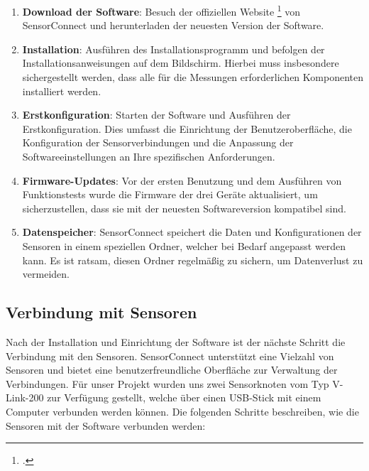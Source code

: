 \begin{enumerate}
    \item \textbf{Download der Software}: Besuch der offiziellen Website \footcite{https://www.microstrain.com/software/sensorconnect} von SensorConnect und herunterladen der neuesten Version der Software.
    \item \textbf{Installation}: Ausführen des Installationsprogramm und befolgen der Installationsanweisungen auf dem Bildschirm. Hierbei muss insbesondere sichergestellt werden, dass alle für die Messungen erforderlichen Komponenten installiert werden.
    \item \textbf{Erstkonfiguration}: Starten der Software und Ausführen der Erstkonfiguration. Dies umfasst die Einrichtung der Benutzeroberfläche, die Konfiguration der Sensorverbindungen und die Anpassung der Softwareeinstellungen an Ihre spezifischen Anforderungen.
    \item \textbf{Firmware-Updates}: Vor der ersten Benutzung und dem Ausführen von Funktionstests wurde die Firmware der drei Geräte aktualisiert, um sicherzustellen, dass sie mit der neuesten Softwareversion kompatibel sind.
    \item \textbf{Datenspeicher}: SensorConnect speichert die Daten und Konfigurationen der Sensoren in einem speziellen Ordner, welcher bei Bedarf angepasst werden kann. Es ist ratsam, diesen Ordner regelmäßig zu sichern, um Datenverlust zu vermeiden.
\end{enumerate}

\subsection{Verbindung mit Sensoren}
Nach der Installation und Einrichtung der Software ist der nächste Schritt die Verbindung mit den Sensoren. SensorConnect unterstützt eine Vielzahl von Sensoren und bietet eine benutzerfreundliche Oberfläche zur Verwaltung der Verbindungen. Für unser Projekt wurden uns zwei Sensorknoten vom Typ V-Link-200 zur Verfügung gestellt, welche über einen USB-Stick mit einem Computer verbunden werden können. Die folgenden Schritte beschreiben, wie die Sensoren mit der Software verbunden werden:

